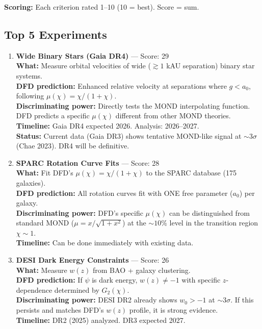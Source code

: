 \documentclass[11pt,a4paper]{article}
\begin{document}
\textbf{Scoring:} Each criterion rated 1--10 (10 = best). Score = sum.

\subsection{Top 5 Experiments}

\begin{enumerate}
\item[\textbf{\#1}] \textbf{Wide Binary Stars (Gaia DR4)} --- Score: 29\\
\textbf{What:} Measure orbital velocities of wide ($\gtrsim 1$ kAU separation) binary star systems.\\
\textbf{DFD prediction:} Enhanced relative velocity at separations where $g < a_0$, following $\mu(\chi) = \chi/(1+\chi)$.\\
\textbf{Discriminating power:} Directly tests the MOND interpolating function. DFD predicts a specific $\mu(\chi)$ different from other MOND theories.\\
\textbf{Timeline:} Gaia DR4 expected 2026. Analysis: 2026--2027.\\
\textbf{Status:} Current data (Gaia DR3) shows tentative MOND-like signal at $\sim 3\sigma$ (Chae 2023). DR4 will be definitive.

\item[\textbf{\#2}] \textbf{SPARC Rotation Curve Fits} --- Score: 28\\
\textbf{What:} Fit DFD's $\mu(\chi) = \chi/(1+\chi)$ to the SPARC database (175 galaxies).\\
\textbf{DFD prediction:} All rotation curves fit with ONE free parameter ($a_0$) per galaxy.\\
\textbf{Discriminating power:} DFD's specific $\mu(\chi)$ can be distinguished from standard MOND ($\mu = x/\sqrt{1+x^2}$) at the $\sim 10\%$ level in the transition region $\chi \sim 1$.\\
\textbf{Timeline:} Can be done immediately with existing data.

\item[\textbf{\#3}] \textbf{DESI Dark Energy Constraints} --- Score: 26\\
\textbf{What:} Measure $w(z)$ from BAO + galaxy clustering.\\
\textbf{DFD prediction:} If $\psi$ is dark energy, $w(z) \neq -1$ with specific $z$-dependence determined by $G_2(\chi)$.\\
\textbf{Discriminating power:} DESI DR2 already shows $w_0 > -1$ at $\sim 3\sigma$. If this persists and matches DFD's $w(z)$ profile, it is strong evidence.\\
\textbf{Timeline:} DR2 (2025) analyzed. DR3 expected 2027.


\end{enumerate}
\end{document}
